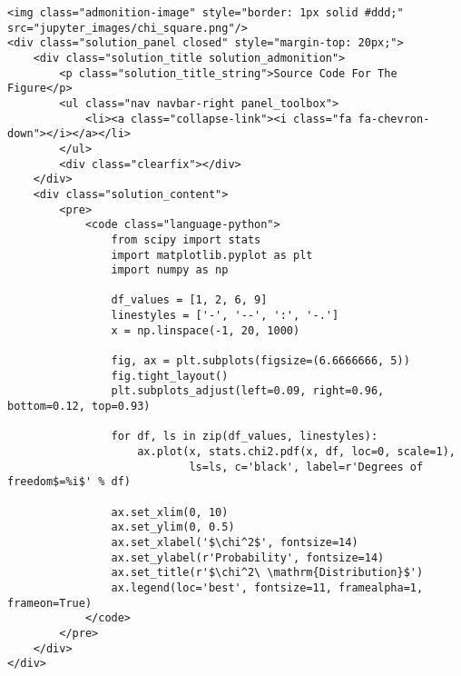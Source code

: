 \documentclass[11pt]{article}
\begin{document}
\begin{verbatim}
<img class="admonition-image" style="border: 1px solid #ddd;" src="jupyter_images/chi_square.png"/>
<div class="solution_panel closed" style="margin-top: 20px;">
    <div class="solution_title solution_admonition">
        <p class="solution_title_string">Source Code For The Figure</p>
        <ul class="nav navbar-right panel_toolbox">
            <li><a class="collapse-link"><i class="fa fa-chevron-down"></i></a></li>
        </ul>
        <div class="clearfix"></div>
    </div>
    <div class="solution_content">
        <pre>
            <code class="language-python">
                from scipy import stats
                import matplotlib.pyplot as plt
                import numpy as np

                df_values = [1, 2, 6, 9]
                linestyles = ['-', '--', ':', '-.']
                x = np.linspace(-1, 20, 1000)

                fig, ax = plt.subplots(figsize=(6.6666666, 5))
                fig.tight_layout()
                plt.subplots_adjust(left=0.09, right=0.96, bottom=0.12, top=0.93)

                for df, ls in zip(df_values, linestyles):
                    ax.plot(x, stats.chi2.pdf(x, df, loc=0, scale=1), 
                            ls=ls, c='black', label=r'Degrees of freedom$=%i$' % df)

                ax.set_xlim(0, 10)
                ax.set_ylim(0, 0.5)
                ax.set_xlabel('$\chi^2$', fontsize=14)
                ax.set_ylabel(r'Probability', fontsize=14)
                ax.set_title(r'$\chi^2\ \mathrm{Distribution}$')
                ax.legend(loc='best', fontsize=11, framealpha=1, frameon=True)
            </code>
        </pre>
    </div>
</div>
\end{verbatim}

\hypertarget{one_tail_two_tail}{}
\end{document}
